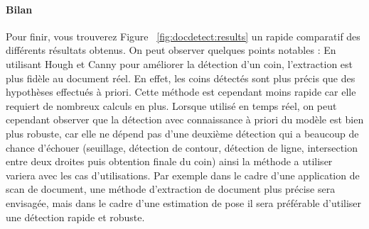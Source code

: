 \paragraph{Bilan}
Pour finir, vous trouverez Figure ~\ref{fig:docdetect:results}
un rapide comparatif des différents résultats obtenus. On peut observer quelques points notables : En utilisant Hough et Canny pour améliorer la détection d'un coin, l'extraction est plus fidèle au document réel. En effet, les coins détectés sont plus précis que des hypothèses effectués à priori. Cette méthode est cependant moins rapide car elle requiert de nombreux calculs en plus. Lorsque utilisé en temps réel, on peut cependant observer que la détection avec connaissance à priori du modèle est bien plus robuste, car elle ne dépend pas d'une deuxième détection qui a beaucoup de chance d'échouer (seuillage, détection de contour, détection de ligne, intersection entre deux droites puis obtention finale du coin) ainsi la méthode a utiliser variera avec les cas d'utilisations. Par exemple dans le cadre d'une application de scan de document, une méthode d'extraction de document plus précise sera envisagée, mais dans le cadre d'une estimation de pose il sera préférable d'utiliser une détection rapide et robuste.

